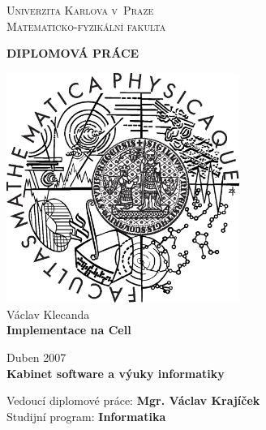 \begin{center}


\large
\textsc{
Univerzita Karlova v~Praze\\
Matematicko-fyzikální fakulta\\[1.2cm]
}


\Huge
\textbf{
DIPLOMOVÁ PRÁCE\\[1.5cm]
}


\includegraphics[height=7.5cm]{data/logo.eps}\\[2cm]


\Large
Václav Klecanda\\[1cm]

\LARGE
\textbf{
Implementace na Cell\\[1cm]
}

\normalsize
Duben 2007\\[1.5cm]

\large
\textbf{
Kabinet software a výuky informatiky\\
}

Vedoucí diplomové práce: \textbf{Mgr. Václav Krajíček}\\

Studijní program: \textbf{Informatika}

\end{center}

\pagebreak
 
